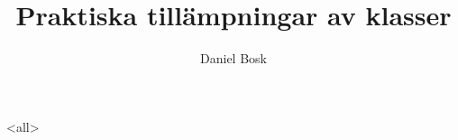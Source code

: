 \documentclass[ignoreframetext]{beamer}
\begin{document}
\title{%
  Praktiska tillämpningar av klasser
}
\author{Daniel Bosk}

\begin{frame}
  \maketitle
\end{frame}

\mode<all>

\mode*
\end{document}
